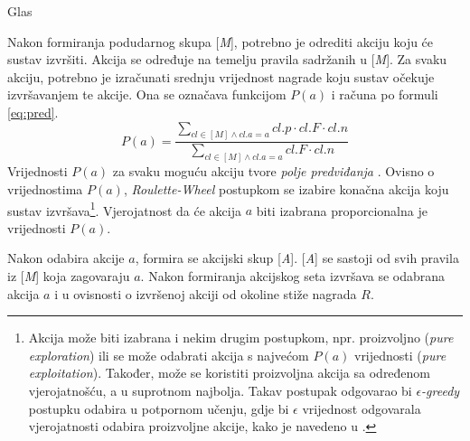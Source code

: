 \documentclass[times, utf8, zavrsni]{fer}
\begin{document}
\begin{algorithm}
    \caption{Glas}
    \label{vote}
    \begin{algorithmic}
        \ENDIF
    \end{algorithmic}
\end{algorithm}

Nakon formiranja podudarnog skupa [\emph{M}], potrebno je odrediti akciju koju će sustav izvršiti.
Akcija se određuje na temelju pravila sadržanih u [\emph{M}].
Za svaku akciju, potrebno je izračunati srednju vrijednost nagrade koju sustav očekuje izvršavanjem te akcije.
Ona se označava funkcijom $P(a)$ i računa po formuli \eqref{eq:pred}.
\begin{equation}
    \label{eq:pred}
    P(a) = \frac{\sum_{cl \in [M] \land cl.a = a} cl.p \cdot cl.F \cdot cl.n}{\sum_{cl \in [M] \land cl.a = a} cl.F \cdot cl.n}
\end{equation}
Vrijednosti $P(a)$ za svaku moguću akciju tvore \emph{polje predviđanja} .
Ovisno o vrijednostima $P(a)$, \emph{Roulette-Wheel} postupkom se izabire konačna akcija koju sustav izvršava\footnote{
Akcija može biti izabrana i nekim drugim postupkom, npr. proizvoljno (\emph{pure exploration}) ili se može odabrati akcija s najvećom $P(a)$ vrijednosti (\emph{pure exploitation}).
Također, može se koristiti proizvoljna akcija sa određenom vjerojatnošću, a u suprotnom najbolja.
Takav postupak odgovarao bi \emph{$\epsilon$-greedy} postupku odabira u potpornom učenju, gdje bi $\epsilon$ vrijednost odgovarala vjerojatnosti odabira proizvoljne akcije, kako je navedeno u \citep{1}.}.
Vjerojatnost da će akcija $a$ biti izabrana proporcionalna je vrijednosti $P(a)$.

Nakon odabira akcije $a$, formira se akcijski skup  [\emph{A}].
[\emph{A}] se sastoji od svih pravila iz [\emph{M}] koja zagovaraju $a$.
Nakon formiranja akcijskog seta izvršava se odabrana akcija $a$ i u ovisnosti o izvršenoj akciji od okoline stiže nagrada $R$.
\end{document}
